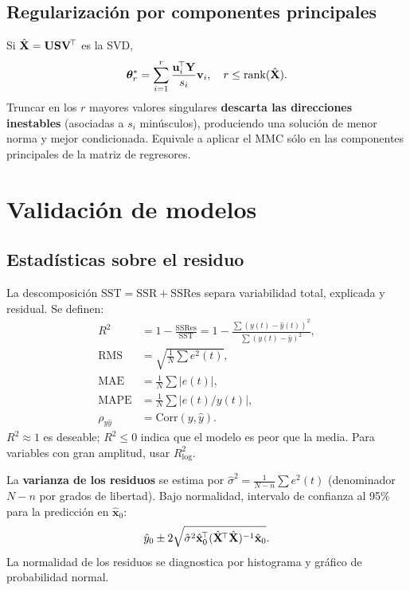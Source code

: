 \subsection{Regularización por componentes principales}

Si $\hat{\mathbf{X}}=\mathbf{U}\mathbf{S}\mathbf{V}^{\!\top}$ es la SVD,
\[
\boldsymbol\theta_{r}^{*}=
\sum_{i=1}^{r}\frac{\mathbf{u}_i^{\!\top}\mathbf{Y}}{s_i}\mathbf{v}_i,
\quad r\leq \mathrm{rank}(\hat{\mathbf{X}}).
\]
Truncar en los $r$ mayores valores singulares \textbf{descarta las
direcciones inestables} (asociadas a $s_i$ minúsculos), produciendo
una solución de menor norma y mejor condicionada. Equivale a aplicar el
MMC sólo en las componentes principales de la matriz de regresores.

\section{Validación de modelos}

\subsection{Estadísticas sobre el residuo}

La descomposición $\mathrm{SST}=\mathrm{SSR}+\mathrm{SSRes}$ separa
variabilidad total, explicada y residual. Se definen:
\begin{align*}
R^2 &= 1-\frac{\mathrm{SSRes}}{\mathrm{SST}}
     = 1-\frac{\sum (y(t)-\hat{y}(t))^2}{\sum(y(t)-\bar{y})^2}, \\
\mathrm{RMS} &= \sqrt{\tfrac{1}{N}\textstyle\sum e^2(t)}, \\
\mathrm{MAE} &= \tfrac{1}{N}\textstyle\sum |e(t)|, \\
\mathrm{MAPE} &= \tfrac{1}{N}\textstyle\sum |e(t)/y(t)|, \\
\rho_{y\hat{y}} &= \mathrm{Corr}(y,\hat{y}).
\end{align*}
$R^2\approx 1$ es deseable; $R^2\leq 0$ indica que el modelo es peor
que la media. Para variables con gran amplitud, usar $R^2_{\log}$.

La \textbf{varianza de los residuos} se estima por
$\hat\sigma^2=\tfrac{1}{N-n}\sum e^2(t)$ (denominador $N-n$ por grados
de libertad). Bajo normalidad, intervalo de confianza al 95\% para la
predicción en $\hat{\mathbf{x}}_0$:
\[
\hat{y}_0 \pm 2\sqrt{\hat\sigma^2 \hat{\mathbf{x}}_0^{\!\top}
(\hat{\mathbf{X}}^{\!\top}\hat{\mathbf{X}})^{-1}\hat{\mathbf{x}}_0}.
\]
La normalidad de los residuos se diagnostica por histograma y gráfico
de probabilidad normal.

